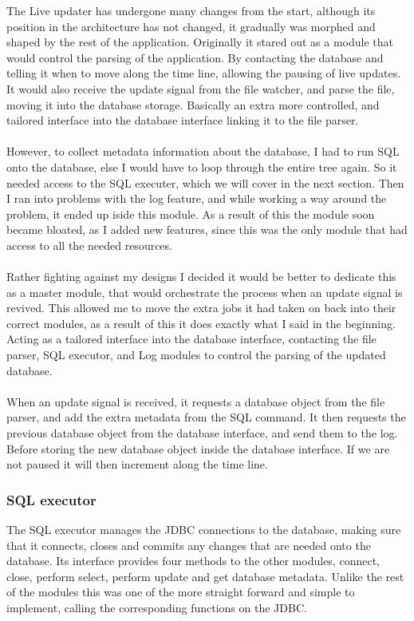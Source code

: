The Live updater has undergone many changes from the start, although its position in the architecture has not changed, it gradually was morphed and shaped by the rest of the application. Originally it stared out as a module that would control the parsing of the application. By contacting the database and telling it when to move along the time line, allowing the pausing of live updates. It would also receive the update signal from the file watcher, and parse the file, moving it into the database storage. Basically an extra more controlled, and tailored interface into the database interface linking it to the file parser.
\\\\
However, to collect metadata information about the database, I had to run SQL onto the database, else I would have to loop through the entire tree again. So it needed access to the SQL executer, which we will cover in the next section. Then I ran into problems with the log feature, and while working a way around the problem, it ended up iside this module. As a result of this the module soon became bloated, as I added new features, since this was the only module that had access to all the needed resources.
\\\\
Rather fighting against my designs I decided it would be better to dedicate this as a master module, that would orchestrate the process when an update signal is revived. This allowed me to move the extra jobs it had taken on back into their correct modules, as a result of this it does exactly what I said in the beginning. Acting as a tailored interface into the database interface, contacting the file parser, SQL executor, and Log modules to control the parsing of the updated database.
\\\\
When an update signal is received, it requests a database object from the file parser, and add the extra metadata from the SQL command. It then requests the previous database object from the database interface, and send them to the log. Before storing the new database object inside the database interface. If we are not paused it will then increment along the time line. 

\subsubsection{SQL executor}
\label{subsubsec:sql_executor_imp}

The SQL executor manages the JDBC connections to the database, making sure that it connects, closes and commits any changes that are needed onto the database. Its interface provides four methods to the other modules, connect, close, perform select, perform update and get database metadata. Unlike the rest of the modules this was one of the more straight forward and simple to implement, calling the corresponding functions on the JDBC.

